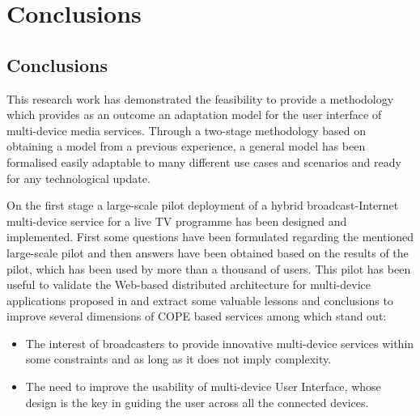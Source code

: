 \chapter{Conclusions}
\label{chap:conclusions}

\section{Conclusions}
This research work has demonstrated the feasibility to provide a methodology which provides as an outcome an adaptation model for the user interface of multi-device media services. Through a two-stage methodology based on obtaining a model from a previous experience, a general model has been formalised easily adaptable to many different use cases and scenarios and ready for any technological update. 

On the first stage a large-scale pilot deployment of a hybrid broadcast-Internet multi-device service for a live TV programme has been designed and implemented. First some questions have been formulated regarding the mentioned large-scale pilot and then answers have been obtained based on the results of the pilot, which has been used by more than a thousand of users. This pilot has been useful to validate the Web-based distributed architecture for multi-device applications proposed in \cite{Zorrilla2015} and extract some valuable lessons and conclusions to improve several dimensions of COPE based services among which stand out:

\begin{itemize}
	\item The interest of broadcasters to provide innovative multi-device services within some constraints and as long as it does not imply complexity.
	\item The need to improve the usability of multi-device User Interface, whose design is the key in guiding the user across all the connected devices.
\end{itemize}

